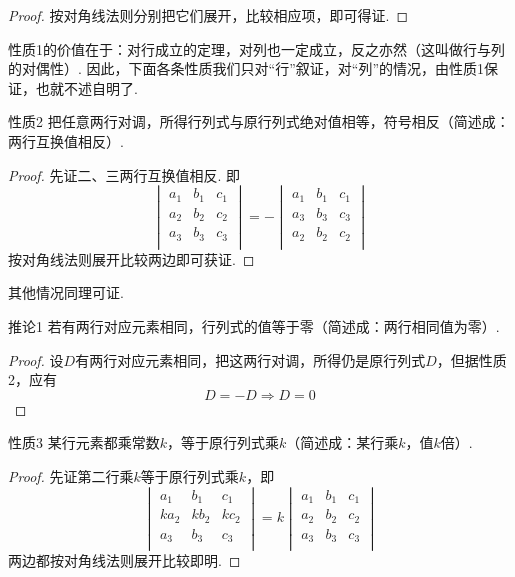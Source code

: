 \begin{proof}
  按对角线法则分别把它们展开，比较相应项，即可得证.
\end{proof}

性质1的价值在于：对行成立的定理，对列也一定成立，反之亦然（这叫做行与列的对偶性）. 因此，下面各条性质我们只对“行”叙证，对“列”的情况，由性质1保证，也就不述自明了.

\begin{thm}
 {性质2} 把任意两行对调，所得行列式与原行列式绝对值相等，符号相反（简述成：两行互换值相反）. 
\end{thm}

\begin{proof}
  先证二、三两行互换值相反. 即
\[\begin{vmatrix}
  a_1&b_1&c_1\\
  a_2&b_2&c_2\\
  a_3&b_3&c_3\\
\end{vmatrix}=-\begin{vmatrix}
  a_1&b_1&c_1\\
  a_3&b_3&c_3\\
  a_2&b_2&c_2\\
\end{vmatrix}\]
按对角线法则展开比较两边即可获证.
\end{proof}

其他情况同理可证.

\begin{thm}
  {推论1} 若有两行对应元素相同，行列式的值等于零（简述成：两行相同值为零）.
\end{thm}

\begin{proof}
  设$D$有两行对应元素相同，把这两行对调，所得仍是原行列式$D$，但据性质2，应有
$$D=-D\Longrightarrow D=0$$
\end{proof}

\begin{thm}
 {性质3} 某行元素都乘常数$k$，等于原行列式乘$k$（简述成：某行乘$k$，值$k$倍）. 
\end{thm}

\begin{proof}
  先证第二行乘$k$等于原行列式乘$k$，即
\[\begin{vmatrix}
  a_1&b_1&c_1\\
  ka_2&kb_2&kc_2\\
  a_3&b_3&c_3\\
\end{vmatrix}=k\begin{vmatrix}
  a_1&b_1&c_1\\
  a_2&b_2&c_2\\
  a_3&b_3&c_3\\
\end{vmatrix}\]
两边都按对角线法则展开比较即明.
\end{proof}


